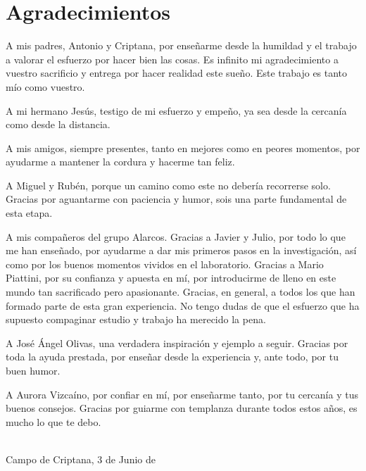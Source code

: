 \ifspanish
\else
\fi

%
%
\cleardoublepage
{} %

\chapter*{Agradecimientos} %

A mis padres, Antonio y Criptana, por enseñarme desde la humildad y el trabajo a valorar el esfuerzo por hacer bien las cosas. Es infinito mi agradecimiento a vuestro sacrificio y entrega por hacer realidad este sueño. Este trabajo es tanto mío como vuestro.

A mi hermano Jesús, testigo de mi esfuerzo y empeño, ya sea desde la cercanía como desde la distancia.

A mis amigos, siempre presentes, tanto en mejores como en peores momentos, por ayudarme a mantener la cordura y hacerme tan feliz.

A Miguel y Rubén, porque un camino como este no debería recorrerse solo. Gracias por aguantarme con paciencia y humor, sois una parte fundamental de esta etapa.

A mis compañeros del grupo Alarcos. Gracias a Javier y Julio, por todo lo que me han enseñado, por ayudarme a dar mis primeros pasos en la investigación, así como por los buenos momentos vividos en el laboratorio. Gracias a Mario Piattini, por su confianza y apuesta en mí, por introducirme de lleno en este mundo tan sacrificado pero apasionante. Gracias, en general, a todos los que han formado parte de esta gran experiencia. No tengo dudas de que el esfuerzo que ha supuesto compaginar estudio y trabajo ha merecido la pena.

A José Ángel Olivas, una verdadera inspiración y ejemplo a seguir. Gracias por toda la ayuda prestada, por enseñar desde la experiencia y, ante todo, por tu buen humor.

A Aurora Vizcaíno, por confiar en mí, por enseñarme tanto, por tu cercanía y tus buenos consejos. Gracias por guiarme con templanza durante todos estos años, es mucho lo que te debo.


\makeatletter		
\begin{flushright}
	\vspace{1,5cm}
	\textit{\@autor}\\
	Campo de Criptana, 3 de Junio de \@yearDef
\end{flushright}
\makeatother
